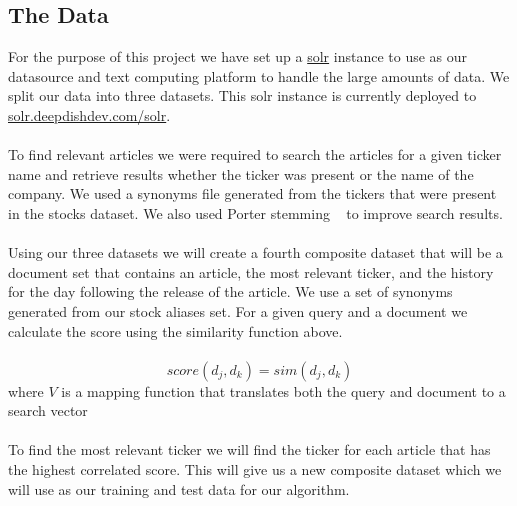 \documentclass[11pt,letterpaper]{article}
\newcommand{\blue}[1]{\textcolor{RoyalBlue}{#1}}
\newcommand{\instructions}[1]{\blue{\textit{#1}}}
\begin{document}
\subsection{The Data}
\label{sec:data}
For the purpose of this project we have set up a \href{http://lucene.apache.org/solr/}{solr}
instance to use as our datasource and text computing platform to
handle the large amounts of data. We split our data into three datasets.
This solr instance is currently deployed to \href{http://solr.deepdishdev.com:8983/solr}{solr.deepdishdev.com/solr}. \\ \\
To find relevant articles we were required to search the articles
for a given ticker name and retrieve results whether the ticker
was present or the name of the company. We used a synonyms file generated
from the tickers that were present in the stocks dataset. We also used Porter
stemming ~\cite{porter} to improve search results. \\ \\
Using our three datasets we will create a fourth composite dataset that will
be a document set that contains an article, the most relevant ticker, and
the history for the day following the release of the article. We use a
set of synonyms generated from our stock aliases set.
For a given query and a document we calculate the score using the
similarity function above. \\ \\
\begin{equation}\label{doc:score}
  	score(d_j, d_k) = sim(d_j, d_k)
\end{equation}
where \(V\) is a mapping function that translates both the query and
document to a search vector \\ \\
To find the most relevant ticker we will find the ticker for each
article that has the highest correlated score.  This will give us a new
composite dataset which we will use as our training and test data for our algorithm.
\end{document}
